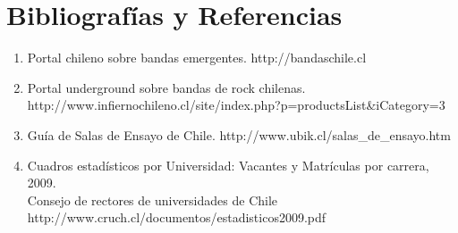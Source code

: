 \section{Bibliografías y Referencias}
\begin{enumerate}
\item Portal chileno sobre bandas emergentes. http://bandaschile.cl
\item Portal underground sobre bandas de rock chilenas.\\ http://www.infiernochileno.cl/site/index.php?p=productsList\&iCategory=3
\item Guía de Salas de Ensayo de Chile. http://www.ubik.cl/salas\_de\_ensayo.htm
\item Cuadros estadísticos por Universidad: Vacantes y Matrículas por carrera, 2009.\\ Consejo de rectores de universidades de Chile \\ http://www.cruch.cl/documentos/estadisticos2009.pdf
\end{enumerate}

